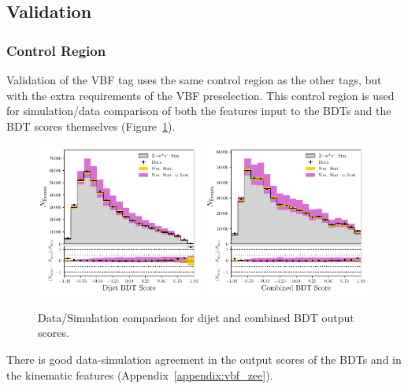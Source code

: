 \subsection{Validation}
\subsubsection{\Zee Control Region}
Validation of the VBF tag uses the same \Zee control region as the other tags, but with the extra requirements of the VBF preselection. 
This control region is used for simulation/data comparison of both the features input to the BDTs and the BDT scores themselves (Figure~\ref{fig:event_categorisation:zee_bdt_score_validation}). 
\begin{figure}[h!]
    \begin{center}
        \includegraphics[width=0.49\textwidth]{figures/event_selection/dijet_BDT_zee_LPS.pdf}
        \includegraphics[width=0.49\textwidth]{figures/event_selection/combined_BDT_zee_LPS.pdf}
    \end{center}
    \caption{Data/Simulation comparison for dijet and combined BDT output scores.}
    \label{fig:event_categorisation:zee_bdt_score_validation}
\end{figure}
There is good data-simulation agreement in the output scores of the BDTs and in the kinematic features (Appendix~\ref{appendix:vbf_zee}).


